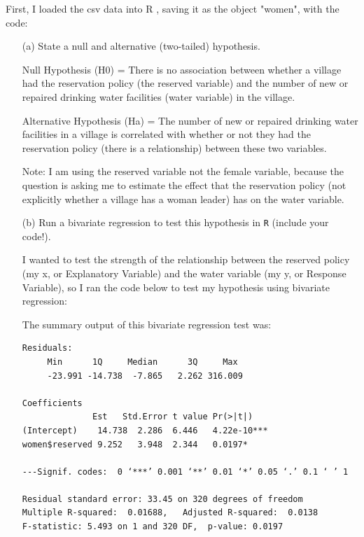 \documentclass[12pt,letterpaper]{article}
\begin{document}
\newpage

First, I loaded the csv data into R , saving it as the object "women", with the code:

	 
	

\begin{enumerate}
	\item [(a)] State a null and alternative (two-tailed) hypothesis. 
	
	Null Hypothesis (H0) = There is no association between whether a village had the reservation policy (the reserved variable) and the number of new or repaired drinking water facilities (water variable) in the village.
	
	Alternative Hypothesis (Ha) = The number of new or repaired drinking water facilities in a village is correlated with whether or not they had the reservation policy (there is a relationship) between these two variables.
	
	Note: I am using the reserved variable not the female variable, because the question is asking me to estimate the effect that the reservation policy (not explicitly whether a village has a woman leader) has on the water variable.
	
	\vspace{1cm}
	\item [(b)] Run a bivariate regression to test this hypothesis in \texttt{R} (include your code!).
	
	I wanted to test the strength of the relationship between the reserved policy (my x, or Explanatory Variable)  and the water variable (my y, or Response Variable), so I ran the code below to test my hypothesis using bivariate regression:
	
	 
	
	The summary output of this bivariate regression test was:
	
	\begin{verbatim}
Residuals:   
	 Min      1Q     Median      3Q     Max 
	 -23.991 -14.738  -7.865   2.262 316.009
	
Coefficients
              Est   Std.Error t value Pr(>|t|)    
(Intercept)    14.738  2.286  6.446   4.22e-10***
women$reserved 9.252   3.948  2.344   0.0197*  

---Signif. codes:  0 ‘***’ 0.001 ‘**’ 0.01 ‘*’ 0.05 ‘.’ 0.1 ‘ ’ 1

Residual standard error: 33.45 on 320 degrees of freedom
Multiple R-squared:  0.01688,	Adjusted R-squared:  0.0138 
F-statistic: 5.493 on 1 and 320 DF,  p-value: 0.0197
	

\end{verbatim}
\end{enumerate}
\end{document}
